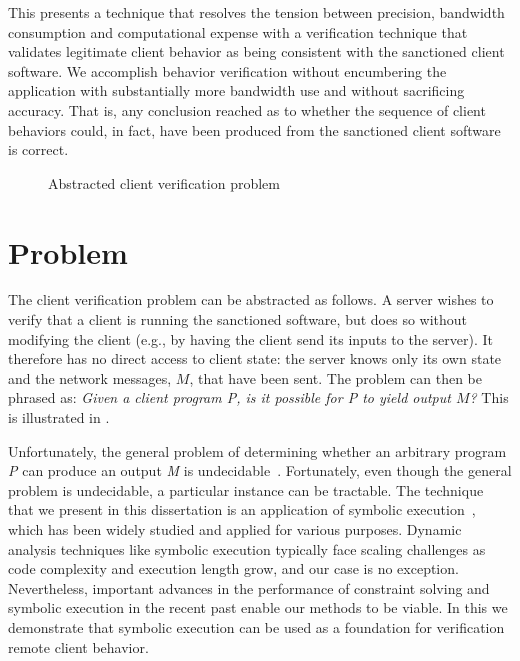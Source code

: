 This \dissertation presents a technique that resolves the tension
between precision, bandwidth consumption and computational expense
with a verification technique that validates legitimate client
behavior as being consistent with the sanctioned client software. We
accomplish behavior verification without encumbering the application
with substantially more bandwidth use and without sacrificing
accuracy. That is, any conclusion reached as to whether the sequence
of client behaviors could, in fact, have been produced from the
sanctioned client software is correct.

\begin{figure}[t]
\centering
{}
\caption{Abstracted client verification problem}
\label{fig:intro:prob}
\end{figure}

\section{Problem}
\label{intro:prob}

The client verification problem can be abstracted as follows. A server
wishes to verify that a client is running the sanctioned software, but
does so without modifying the client (e.g., by having the client send
its inputs to the server).  It therefore has no direct access to
client state: the server knows only its own state and the network
messages, $M$, that have been sent.  The problem can then be phrased
as: \emph{Given a client program P, is it possible for P to yield
output $M$?}  This is illustrated in .

Unfortunately, the general problem of determining whether an arbitrary
program \emph{P} can produce an output \emph{M} is
undecidable~\cite{turing36}.
Fortunately, even though the general problem is undecidable, a
particular instance can be tractable.  The technique that we present
in this dissertation is an application of symbolic
execution~\cite{boyer75:select,king76:symbex}, which has been widely
studied and applied for various purposes.  Dynamic analysis techniques
like symbolic execution typically face scaling challenges as code
complexity and execution length grow, and our case is no exception.
Nevertheless, important advances in the performance of constraint
solving and symbolic execution in the recent past enable our methods
to be viable. In this \dissertation we demonstrate that symbolic
execution can be used as a foundation for verification remote client
behavior.

